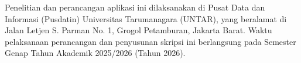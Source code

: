 Penelitian dan perancangan aplikasi ini dilaksanakan di Pusat Data dan Informasi (Pusdatin) Universitas Tarumanagara (UNTAR), yang beralamat di Jalan Letjen S. Parman No. 1, Grogol Petamburan, Jakarta Barat. Waktu pelaksanaan perancangan dan penyusunan skripsi ini berlangsung pada Semester Genap Tahun Akademik 2025/2026 (Tahun 2026).